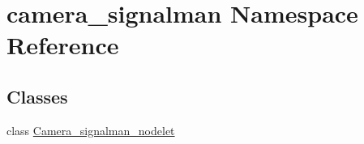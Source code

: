 \hypertarget{namespacecamera__signalman}{}\section{camera\+\_\+signalman Namespace Reference}
\label{namespacecamera__signalman}
\subsection*{Classes}
\begin{DoxyCompactItemize}
\item 
class \mbox{\hyperlink{classcamera__signalman_1_1Camera__signalman__nodelet}{Camera\+\_\+signalman\+\_\+nodelet}}
\end{DoxyCompactItemize}
